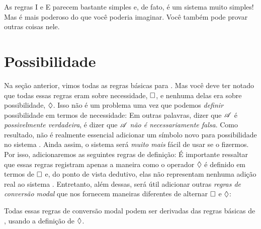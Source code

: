 As regras \ebox I e \ebox E parecem bastante simples e, de fato, \mlK{} é um sistema muito simples! Mas \mlK{} é mais poderoso do que você poderia imaginar. Você também pode  provar outras coisas nele.


\section{Possibilidade}
\label{possibility}

Na seção anterior, vimos todas as regras básicas para \mlK. Mas você deve ter notado que todas essas regras eram sobre necessidade,  $\Box$, e nenhuma delas era sobre possibilidade, $\Diamond$. Isso não é um problema uma vez que podemos \emph{definir} possibilidade em termos de necessidade:
Em outras palavras, dizer que $\mathscr{A}$ é \emph{possivelmente verdadeira}, é dizer que $\mathscr{A}$   \emph{não é necessariamente falsa}. Como resultado, não é realmente essencial adicionar um símbolo novo para possibilidade  no sistema \mlK. Ainda assim, o sistema será \emph{muito mais} fácil de usar se o fizermos. Por isso, adicionaremos as seguintes regras de definição:
É importante ressaltar que essas regras registram apenas a maneira como  o operador $\Diamond$  é definido em termos de $\Box$ e, do ponto de vista dedutivo, elas não representam nenhuma adição real ao sistema \mlK. Entretanto, além dessas,  será útil adicionar outras \emph{regras de conversão modal} que nos fornecem maneiras  diferentes de alternar  $\Box$  e $\Diamond$:
 

Todas essas regras de conversão modal podem ser derivadas das regras básicas de \mlK, usando a  definição de $\Diamond$. 

